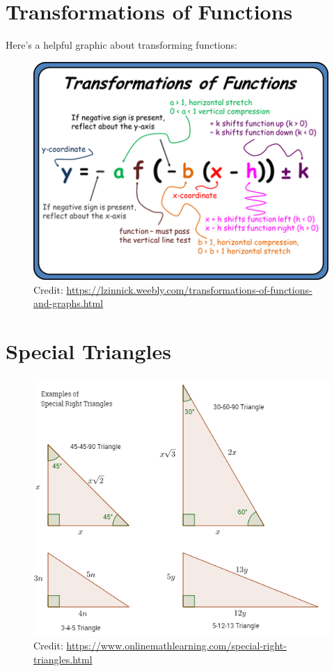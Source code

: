 \documentclass[12pt]{article}
\begin{document}
\section{Transformations of Functions}

Here's a helpful graphic about transforming functions:

\begin{figure}[H]
	\centering
	\includegraphics[scale=0.5]{9546920.png}
	\caption{Credit: \url{https://lzinnick.weebly.com/transformations-of-functions-and-graphs.html}}
\end{figure}

\section{Special Triangles}

\begin{figure}[H]
	\centering
	\includegraphics[scale=0.5]{triangles.png}
	\caption{Credit: \url{https://www.onlinemathlearning.com/special-right-triangles.html}}
\end{figure}
\end{document}
